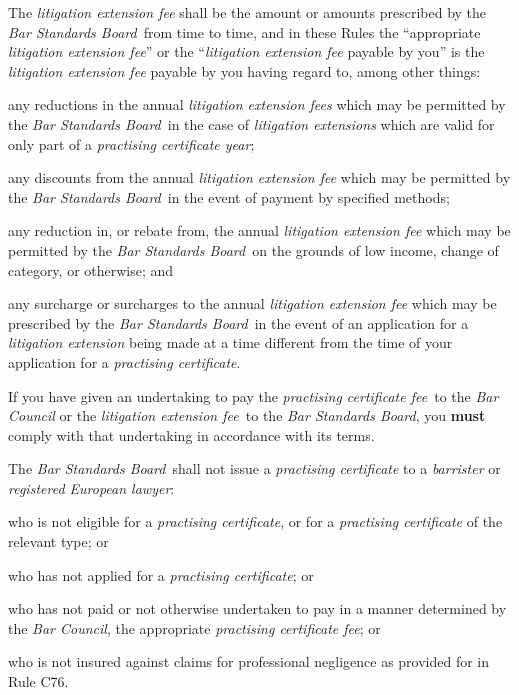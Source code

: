The \emph{litigation extension fee} shall be the amount or amounts
prescribed by the \emph{Bar Standards Board}~from time to time, and in
these Rules the ``appropriate \emph{litigation extension fee}'' or the
``\emph{litigation extension fee} payable by you'' is the
\emph{litigation extension fee} payable by you having regard to, among
other things:\nl\item any reductions in the annual \emph{litigation extension fees} which
may be permitted by the \emph{Bar Standards Board}~in the case of
\emph{litigation extensions} which are valid for only part of a
\emph{practising certificate year};
\item any discounts from the annual \emph{litigation extension fee} which
may be permitted by the \emph{Bar Standards Board}~in the event of
payment by specified methods;
\item any reduction in, or rebate from, the annual \emph{litigation
extension fee} which may be permitted by the \emph{Bar Standards
Board}~on the grounds of low income, change of category, or otherwise;
and
\item any surcharge or surcharges to the annual \emph{litigation extension
fee} which may be prescribed by the \emph{Bar Standards Board}~in the
event of an application for a \emph{litigation extension} being made at
a time different from the time of your application for a
\emph{practising certificate}.
\ln
{}

If you have given an undertaking to pay the \emph{practising certificate
fee}~to the \emph{Bar Council} or the \emph{litigation extension fee~}to
the \emph{Bar Standards Board}, you \textcolor{myred}{\textbf{must }}comply with that undertaking in
accordance with its terms.




The \emph{Bar Standards Board}~shall not issue a \emph{practising
certificate} to a \emph{barrister} or \emph{registered European lawyer}:\nl\item who is not eligible for a \emph{practising certificate}, or for a
\emph{practising certificate} of the relevant type; or
\item who has not applied for a \emph{practising certificate}; or
\item who has not paid or not otherwise undertaken to pay in a manner
determined by the \emph{Bar Council}, the appropriate \emph{practising
certificate fee}; or
\item who is not insured against claims for professional negligence as
provided for in Rule C76.
\ln
{}

